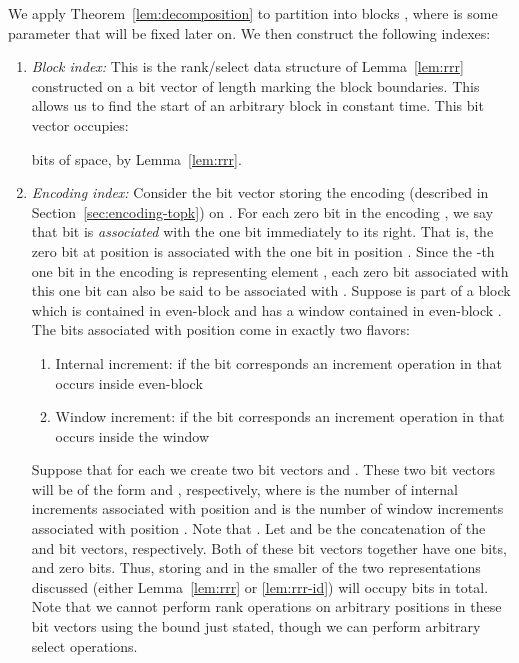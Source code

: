 \documentclass[runningheads]{llncs}
\begin{document}
We apply Theorem~\ref{lem:decomposition} to partition  into
 blocks ,
where  is some parameter that will be fixed later on. We then
construct the following indexes:

\begin{enumerate}

\item \emph{Block index:} This is the rank/select data structure of
  Lemma~\ref{lem:rrr} constructed on a bit vector of length 
  marking the block boundaries.  This allows us to find the start of
  an arbitrary block in constant time. This bit vector occupies:

\noindent 
bits of space, by Lemma~\ref{lem:rrr}.

\item \emph{Encoding index:} Consider the bit vector storing the
  encoding  (described in Section~\ref{sec:encoding-topk}) on
  . For each zero bit in the encoding , we say that bit is
  \emph{associated} with the one bit immediately to its right.  That
  is, the zero bit at position  is associated with the one bit in
  position .  Since the -th one bit
  in the encoding is representing element , each zero bit
  associated with this one bit can also be said to be associated with
  . Suppose  is part of a block  which is
  contained in even-block  and has a window contained
  in even-block .  The  bits associated with
  position  come in exactly two flavors:

  \begin{enumerate}
    \item Internal increment: if the  bit corresponds an increment
      operation in  that occurs inside even-block 
    \item Window increment: if the  bit corresponds an increment
      operation in  that occurs inside the window 
  \end{enumerate}
  
  Suppose that for each  we create two bit vectors
   and .  These two bit vectors
  will be of the form  and , respectively,
  where  is the number of internal increments associated
  with position  and  is the number of window increments
  associated with position .  Note that . Let  and  be the
  concatenation of the  and  bit
  vectors, respectively.  Both of these bit vectors together have 
  one bits, and  zero bits.  Thus, storing  and
   in the smaller of the two representations discussed
  (either Lemma~\ref{lem:rrr} or \ref{lem:rrr-id}) will occupy  bits in
  total.  Note that we cannot perform rank operations on arbitrary
  positions in these bit vectors using the bound just stated, though
  we can perform arbitrary select operations.



\end{enumerate}
\end{document}
